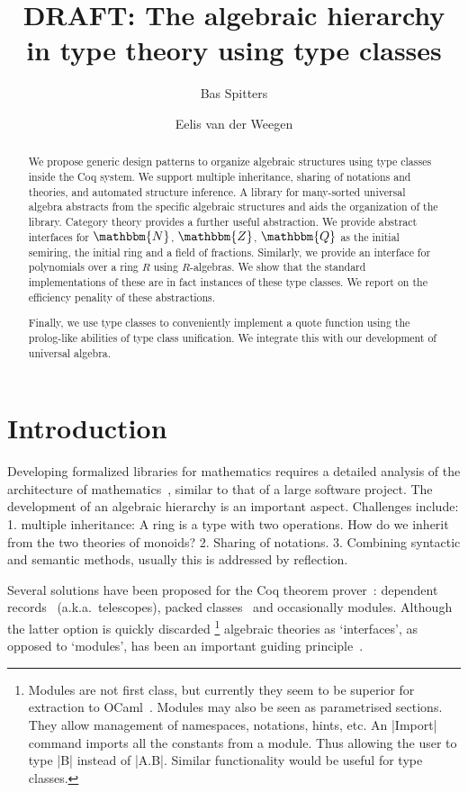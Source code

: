 \documentclass[a4paper,10pt, runningheads]{llncs}
\newcommand{\N}{\ensuremath{\mathbbm{N}}}
\newcommand{\Z}{\ensuremath{\mathbbm{Z}}}
\newcommand{\Q}{\ensuremath{\mathbbm{Q}}}
\begin{document}
\title{DRAFT: The algebraic hierarchy in type theory using type classes}
\author{Bas Spitters \and Eelis van der Weegen}
\maketitle
\begin{abstract}
We propose generic design patterns to organize algebraic structures using type classes inside the
Coq system. We support multiple inheritance, sharing of notations and theories, and automated
structure inference. A library for many-sorted universal algebra abstracts from the specific
algebraic structures and aids the organization of the library. Category theory provides a further
useful abstraction. We provide abstract
interfaces for $\N$, $\Z$, $\Q$ as the initial semiring, the initial ring and a field of
fractions. Similarly, we provide an interface for polynomials over a ring $R$ using $R$-algebras.
We show that the standard implementations of these are in fact instances of these type classes.
We report on the efficiency penality of these abstractions.

Finally, we use type classes to conveniently implement a quote function using the prolog-like
abilities of type class unification. We integrate this with our development of universal algebra.
\end{abstract}

\section{Introduction}
Developing formalized libraries for mathematics requires a detailed analysis of the
architecture of mathematics~\cite{C-corn,DBLP:conf/types/HaftmannW08}, similar to that of a large
software project.
The development of an algebraic hierarchy is an important aspect. Challenges include: 1. multiple
inheritance: A ring is a type with two operations. How do we inherit from the two theories of
monoids? 2. Sharing of notations. 3. Combining syntactic and semantic methods, usually this is
addressed by reflection.

Several solutions have been proposed for the Coq theorem prover~\cite{Coq,BC04}: dependent
records~\cite{DBLP:journals/jsc/GeuversPWZ02} (a.k.a.\ telescopes), packed classes~\cite{Packed} and
occasionally modules. Although the latter option is quickly discarded%
\footnote{Modules are not first class, but currently they seem to be superior for extraction to
OCaml~\cite{letouzey02}. Modules may also be seen as parametrised sections. They allow management
of namespaces, notations, hints, etc. An |Import| command imports all the constants from a
module. Thus allowing the user to type |B| instead of |A.B|. Similar functionality would be useful
for type classes.}
algebraic theories as `interfaces', as opposed to `modules', has been an important
guiding principle~\cite{Packed}.
\end{document}
